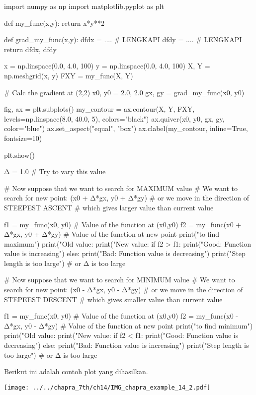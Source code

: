\begin{pythoncode}
import numpy as np
import matplotlib.pyplot as plt

def my_func(x,y):
    return x*y**2

def grad_my_func(x,y):
    dfdx = .... # LENGKAPI
    dfdy = .... # LENGKAPI
    return dfdx, dfdy


x = np.linspace(0.0, 4.0, 100)
y = np.linspace(0.0, 4.0, 100)
X, Y = np.meshgrid(x, y)
FXY = my_func(X, Y)

# Calc the gradient at (2,2)
x0, y0 = 2.0, 2.0
gx, gy = grad_my_func(x0, y0)

fig, ax = plt.subplots()
my_contour = ax.contour(X, Y, FXY, levels=np.linspace(8.0, 40.0, 5), colors="black")
ax.quiver(x0, y0, gx, gy, color="blue")
ax.set_aspect("equal", "box")
ax.clabel(my_contour, inline=True, fontsize=10)

plt.show()

Δ = 1.0 # Try to vary this value

# Now suppose that we want to search for MAXIMUM value
# We want to search for new point: (x0 + Δ*gx, y0 + Δ*gy)
# or we move in the direction of STEEPEST ASCENT
# which gives larger value than current value

f1 = my_func(x0, y0) # Value of the function at (x0,y0)
f2 = my_func(x0 + Δ*gx, y0 + Δ*gy) # Value of the function at new point
print("\nTrying to find maximum")
print("Old value: %
print("New value: %
if f2 > f1:
    print("Good: Function value is increasing")
else:
    print("Bad: Function value is decreasing")
    print("Step length is too large") # or Δ is too large

# Now suppose that we want to search for MINIMUM value
# We want to search for new point: (x0 - Δ*gx, y0 - Δ*gy)
# or we move in the direction of STEPEEST DESCENT
# which gives smaller value than current value

f1 = my_func(x0, y0) # Value of the function at (x0,y0)
f2 = my_func(x0 - Δ*gx, y0 - Δ*gy) # Value of the function at new point
print("\nTrying to find minimum")
print("Old value: %
print("New value: %
if f2 < f1:
    print("Good: Function value is decreasing")
else:
    print("Bad: Function value is increasing")
    print("Step length is too large") # or Δ is too large
\end{pythoncode}


Berikut ini adalah contoh plot yang dihasilkan.

{\centering
\texttt{[image: ../../chapra\_7th/ch14/IMG\_chapra\_example\_14\_2.pdf]}
\par}

